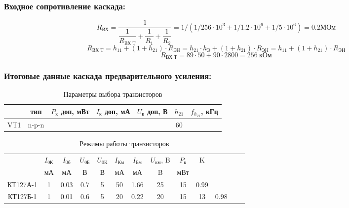\subsubsection{Входное сопротивление каскада:}
\begin{equation}
   \label{eq:equation6_22}
R_{\text{ВХ}}=\dfrac{1}{\dfrac{1}{R_\text{ВХ Т}}+\dfrac{1}{R_1}+\dfrac{1}{R_2}}=1/(1/256 \cdot 10^3 +1/1.2 \cdot 10^6 + 1/5 \cdot 10^6)=0.2\text{МОм}
\end{equation}
\begin{equation}
   \label{eq:equation6_23}
R_{\text{ВХ Т}}=h_{11}+(1+h_{21})\cdot R_{\text{ЭН}}=h_{21} \cdot h_{\text{Э}}+(1+h_{21}) \cdot R_{\text{ЭН}}=h_{11}+(1+h_{21}) \cdot R_{\text{ЭН}}
\end{equation}
\begin{equation*}
R_{\text{ВХ Т}}=89 \cdot 50+90 \cdot 2800 =256~\text{кОм}
\end{equation*}

\subsubsection{Итоговые данные каскада предварительного усиления:}


\begin{table}[htbp]
\caption{Параметры выбора транзисторов }
\begin{center}\begin{tabular}{|c|c|c|c|c|c|c|}
\hline 
  & тип & $P_{\text{к}}$ доп, мВт & $I_{\text{к}}$ доп, мА & $U_{\text{к}}$ доп, В & $h_{21}$ &  $f_{h_{21}}$, кГц \\ 
\hline 
VT1  & n-p-n &   &  &  & 60 & \\ 
\hline 
\end{tabular} 
\end{center}
\end{table}

\begin{table}[htbp]
\caption{Режимы работы транзисторов}
\begin{center}\begin{tabular}{|c|c|c|c|c|c|c|c|c|c|c|c|c|}
\hline 
   & $I_\text{0К}$ & $I_\text{0б}$& $U_\text{0Б}$ & $U_\text{0К}$&  $I_{\text{Км}}$  & $I_{\text{Бм}}$& $U_{\text{км}}$, B & $P_{\text{к}}$ & K\\ 
  & мА & мА& В & В & мА & мА & B & мВт & \\
\hline 
КТ127А-1 & 1 & 0.03 & 0.7 & 5 & 50 & 1.66 & 25 & 15 & 0.99 \\
\hline 
КТ127Б-1 & 1  &  0.01  &  0.6  & 5  & 20 &   0.22  &  20  &  15  &  13  &  0.98 \\
\hline
\end{tabular} 
\end{center}
\end{table}

